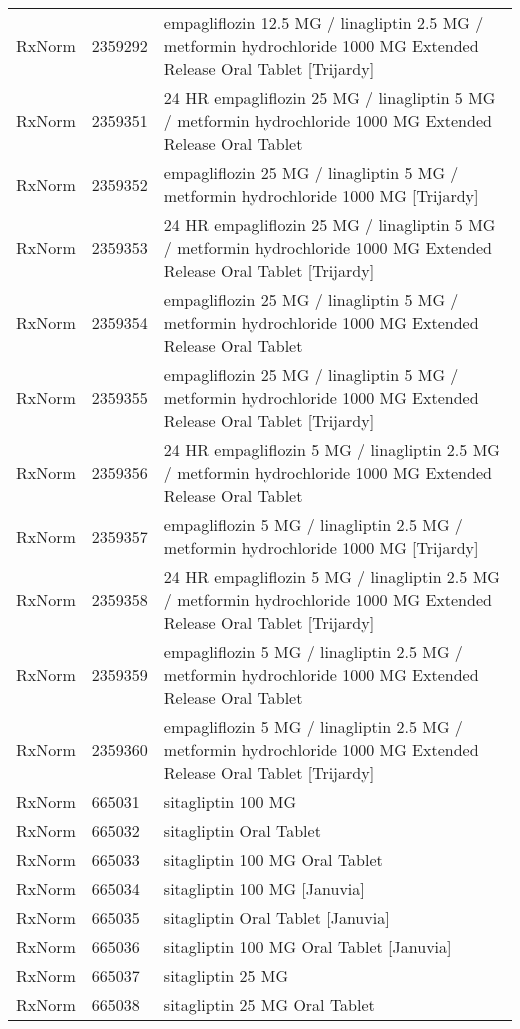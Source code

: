 \begin{longtable}{p{}p{}p{}}
  RxNorm & 2359292 & empagliflozin 12.5 MG / linagliptin 2.5 MG / metformin hydrochloride 1000 MG Extended Release Oral Tablet [Trijardy] \\ 
  RxNorm & 2359351 & 24 HR empagliflozin 25 MG / linagliptin 5 MG / metformin hydrochloride 1000 MG Extended Release Oral Tablet \\ 
  RxNorm & 2359352 & empagliflozin 25 MG / linagliptin 5 MG / metformin hydrochloride 1000 MG [Trijardy] \\ 
  RxNorm & 2359353 & 24 HR empagliflozin 25 MG / linagliptin 5 MG / metformin hydrochloride 1000 MG Extended Release Oral Tablet [Trijardy] \\ 
  RxNorm & 2359354 & empagliflozin 25 MG / linagliptin 5 MG / metformin hydrochloride 1000 MG Extended Release Oral Tablet \\ 
  RxNorm & 2359355 & empagliflozin 25 MG / linagliptin 5 MG / metformin hydrochloride 1000 MG Extended Release Oral Tablet [Trijardy] \\ 
  RxNorm & 2359356 & 24 HR empagliflozin 5 MG / linagliptin 2.5 MG / metformin hydrochloride 1000 MG Extended Release Oral Tablet \\ 
  RxNorm & 2359357 & empagliflozin 5 MG / linagliptin 2.5 MG / metformin hydrochloride 1000 MG [Trijardy] \\ 
  RxNorm & 2359358 & 24 HR empagliflozin 5 MG / linagliptin 2.5 MG / metformin hydrochloride 1000 MG Extended Release Oral Tablet [Trijardy] \\ 
  RxNorm & 2359359 & empagliflozin 5 MG / linagliptin 2.5 MG / metformin hydrochloride 1000 MG Extended Release Oral Tablet \\ 
  RxNorm & 2359360 & empagliflozin 5 MG / linagliptin 2.5 MG / metformin hydrochloride 1000 MG Extended Release Oral Tablet [Trijardy] \\ 
  RxNorm & 665031 & sitagliptin 100 MG \\ 
  RxNorm & 665032 & sitagliptin Oral Tablet \\ 
  RxNorm & 665033 & sitagliptin 100 MG Oral Tablet \\ 
  RxNorm & 665034 & sitagliptin 100 MG [Januvia] \\ 
  RxNorm & 665035 & sitagliptin Oral Tablet [Januvia] \\ 
  RxNorm & 665036 & sitagliptin 100 MG Oral Tablet [Januvia] \\ 
  RxNorm & 665037 & sitagliptin 25 MG \\ 
  RxNorm & 665038 & sitagliptin 25 MG Oral Tablet \\ 

\end{longtable}
